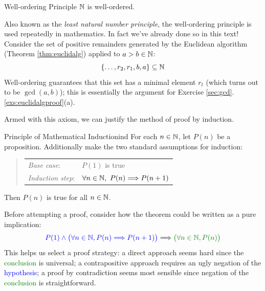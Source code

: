 \begin{axiom}{Well-ordering Principle}{}
	$\mathbb{N}$ is well-ordered.
\end{axiom}


Also known as the \emph{least natural number principle}, the well-ordering principle is used repeatedly in mathematics. In fact we've already done so in this text! Consider the set of positive remainders generated by the Euclidean algorithm (Theorem \ref{thm:euclidalg}) applied to $a>b\in\mathbb{N}$:
\[
	\{\ldots,r_2,r_1,b,a\}\subseteq\mathbb{N}
\]
Well-ordering guarantees that this set has a minimal element $r_t$ (which turns out to be $\gcd(a,b)$); this is essentially the argument for Exercise \ref*{sec:gcd}.\ref{exs:euclidalgproof}(a).

\goodbreak  

Armed with this axiom, we can justify the method of proof by induction. 

\begin{thm}{Principle of Mathematical Induction}{ind}
	For each $n\in\mathbb{N}$, let $P(n)$ be a proposition. Additionally make the two standard assumptions for induction:
	\begin{quote}
		\begin{tabular}{@{}ll}
			\emph{Base case}: &$P(1)$ is true\\[5pt]
			\emph{Induction step}: &$\forall n\in\mathbb{N},\ P(n)\Longrightarrow P(n+1)$
		\end{tabular}
	\end{quote}
	Then $P(n)$ is true for all $n\in\mathbb{N}$.
\end{thm}

Before attempting a proof, consider how the theorem could be written as a pure implication:
\[
	\textcolor{blue}{P(1)\wedge\bigl(\forall n\in\N,P(n)\Longrightarrow P(n+1)\bigr)}\Longrightarrow \textcolor{Green}{\bigl(\forall n\in\N, P(n)\bigr)}
\]
This helps us select a proof strategy: a direct approach seems hard since the \textcolor{Green}{conclusion} is universal; a contrapositive approach requires an ugly negation of the \textcolor{blue}{hypothesis}; a proof by contradiction seems most sensible since negation of the \textcolor{Green}{conclusion} is straightforward.

